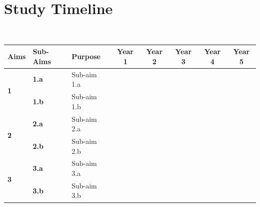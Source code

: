\newpage

\section*{Study Timeline}

~

\begin{table}[ht]
    \footnotesize
    \centering
    \begin{tabular}{m{8mm} m{17mm} m{60mm} m{5mm} m{5mm} m{5mm} m{5mm} m{5mm} m{5mm} m{5mm} m{5mm} m{5mm} m{5mm}}
        \hline
        \textbf{Aims} & \textbf{Sub-Aims} & \textbf{Purpose} & \multicolumn{2}{c}{\textbf{Year 1}} & \multicolumn{2}{c}{\textbf{Year 2}} & \multicolumn{2}{c}{\textbf{Year 3}} & \multicolumn{2}{c}{\textbf{Year 4}} & \multicolumn{2}{c}{\textbf{Year 5}} \\
        \hline
        \multirow{2}{8mm}{\textbf{1}} & \textbf{1.a} & Sub-aim 1.a & ~ & \cellcolor{darkgray} & \cellcolor{darkgray} & \cellcolor{darkgray} & \cellcolor{darkgray} & \cellcolor{darkgray} & \cellcolor{darkgray} & ~ & ~ & ~ \\
        ~ & \textbf{1.b} & Sub-aim 1.b & \cellcolor{darkgray} & \cellcolor{darkgray} & \cellcolor{darkgray} & \cellcolor{darkgray} & \cellcolor{darkgray} & \cellcolor{darkgray} & ~ & ~ & ~ & ~ \\
        \hline 
        \multirow{2}{8mm}{\textbf{2}} & \textbf{2.a} & Sub-aim 2.a & \cellcolor{darkgray} & \cellcolor{darkgray} & \cellcolor{darkgray} & \cellcolor{darkgray} & \cellcolor{darkgray} & \cellcolor{darkgray} & ~ & ~ & ~ & ~ \\
        ~ & \textbf{2.b} & Sub-aim 2.b & ~ & \cellcolor{darkgray} & \cellcolor{darkgray} & \cellcolor{darkgray} & \cellcolor{darkgray} & \cellcolor{darkgray} & \cellcolor{darkgray} & \cellcolor{darkgray} & \cellcolor{darkgray} & ~ \\
        \hline  
        \multirow{2}{8mm}{\textbf{3}} & \textbf{3.a} & Sub-aim 3.a & \cellcolor{darkgray} & \cellcolor{darkgray} & \cellcolor{darkgray} & \cellcolor{darkgray} & \cellcolor{darkgray} & \cellcolor{darkgray} & ~ & ~ & ~ & ~ \\
        ~ & \textbf{3.b} & Sub-aim 3.b & ~ & ~ & ~ & ~ & \cellcolor{darkgray} & \cellcolor{darkgray} & \cellcolor{darkgray} & \cellcolor{darkgray} &\cellcolor{darkgray} & \cellcolor{darkgray} \\
        \hline        
    \end{tabular}
    \label{tab:timeline}
\end{table}

